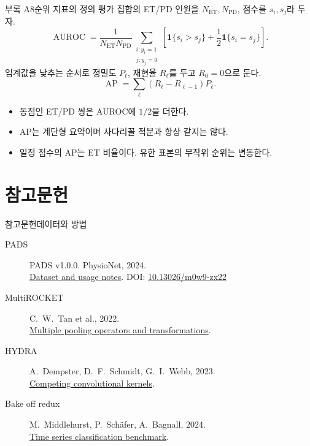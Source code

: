 \documentclass[aspectratio=169,11pt]{beamer}
\newcommand{\ind}{\mathbf 1}
\newcommand{\PD}{\mathrm{PD}}
\newcommand{\ET}{\mathrm{ET}}
\begin{document}
\begin{frame}[t,label=ranking-exact]{부록 A8\quad 순위 지표의 정의}
\small
평가 집합의 ET/PD 인원을 \(N_{\ET},N_{\PD}\), 점수를 \(s_i,s_j\)라 두자.
\[
 \operatorname{AUROC}=
 \frac1{N_{\ET}N_{\PD}}
 \sum_{\substack{i:y_i=1\\j:y_j=0}}
 \left[\ind\{s_i>s_j\}+\frac12\ind\{s_i=s_j\}\right].
\]
임계값을 낮추는 순서로 정밀도 \(P_\ell\), 재현율 \(R_\ell\)를 두고 \(R_0=0\)으로 둔다.
\[
 \operatorname{AP}=\sum_\ell(R_\ell-R_{\ell-1})P_\ell.
\]
\begin{itemize}
 \item 동점인 ET/PD 쌍은 AUROC에 \(1/2\)을 더한다.
 \item AP는 계단형 요약이며 사다리꼴 적분과 항상 같지는 않다.
 \item 일정 점수의 AP는 ET 비율이다. 유한 표본의 무작위 순위는 변동한다.
\end{itemize}
\end{frame}

\section{참고문헌}
\begin{frame}[t,label=ref-papers]{참고문헌\quad 데이터와 방법}
\small
\begin{description}
 \item[PADS] PADS v1.0.0. PhysioNet, 2024.\\
  \href{https://physionet.org/content/parkinsons-disease-smartwatch/1.0.0/}{Dataset and usage notes}.
  DOI: \href{https://doi.org/10.13026/m0w9-zx22}{10.13026/m0w9-zx22}
 \item[MultiROCKET] C.~W.~Tan et al., 2022.\\
  \href{https://doi.org/10.1007/s10618-022-00844-1}{Multiple pooling operators and transformations}.
 \item[HYDRA] A.~Dempster, D.~F.~Schmidt, G.~I.~Webb, 2023.\\
  \href{https://doi.org/10.1007/s10618-023-00939-3}{Competing convolutional kernels}.
 \item[Bake off redux] M.~Middlehurst, P.~Sch\"afer, A.~Bagnall, 2024.\\
  \href{https://doi.org/10.1007/s10618-024-01022-1}{Time series classification benchmark}.
\end{description}
\end{frame}
\end{document}
